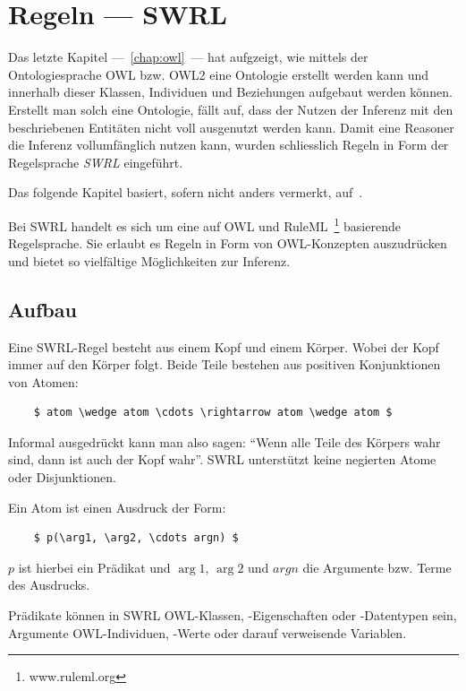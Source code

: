 \chapter{Regeln --- SWRL}
\label{chap:swrl}

Das letzte Kapitel ---~\ref{chap:owl}~--- hat aufgzeigt, wie mittels der Ontologiesprache OWL bzw. OWL2 eine Ontologie erstellt werden kann und innerhalb dieser Klassen, Individuen und Beziehungen aufgebaut werden können. Erstellt man solch eine Ontologie, fällt auf, dass der Nutzen der Inferenz mit den beschriebenen Entitäten nicht voll ausgenutzt werden kann. Damit eine Reasoner die Inferenz vollumfänglich nutzen kann, wurden schliesslich Regeln in Form der Regelsprache \textit{SWRL} eingeführt.

Das folgende Kapitel basiert, sofern nicht anders vermerkt, auf~\cite{swrl}.

Bei SWRL handelt es sich um eine auf OWL und RuleML~\footnote{www.ruleml.org} basierende Regelsprache. Sie erlaubt es Regeln in Form von OWL-Konzepten auszudrücken und bietet so vielfältige Möglichkeiten zur Inferenz.

\section{Aufbau}
\label{sec:swrl_aufbau}
Eine SWRL-Regel besteht aus einem Kopf und einem Körper. Wobei der Kopf immer auf den Körper folgt. Beide Teile bestehen aus positiven Konjunktionen von Atomen:
\lstset{language=XML}
\begin{lstlisting}
    $ atom \wedge atom \cdots \rightarrow atom \wedge atom $
\end{lstlisting}

Informal ausgedrückt kann man also sagen: ``Wenn alle Teile des Körpers wahr sind, dann ist auch der Kopf wahr''. SWRL unterstützt keine negierten Atome oder Disjunktionen.

Ein Atom ist einen Ausdruck der Form:
\lstset{language=XML}
\begin{lstlisting}
    $ p(\arg1, \arg2, \cdots argn) $
\end{lstlisting}
$p$ ist hierbei ein Prädikat und $\arg1$, $\arg2$ und $argn$ die Argumente bzw. Terme des Ausdrucks.

Prädikate können in SWRL OWL-Klassen, -Eigenschaften oder -Datentypen sein, Argumente OWL-Individuen, -Werte oder darauf verweisende Variablen.

